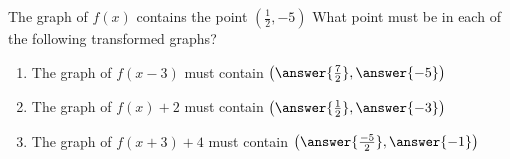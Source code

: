 \documentclass{ximera}
\author{David Kish}
\begin{document}
\begin{exercise}
The graph of $f(x)$ contains the point $\left(\frac{1}{2},-5\right)$ What point must be in each of the following transformed graphs?
\begin{enumerate}
\item The graph of $f(x-3)$ must contain $\left(\answer{\frac{7}{2}},\answer{-5}\right)$
\item The graph of $f(x)+2$ must contain $\left(\answer{\frac{1}{2}},\answer{-3}\right)$
\item The graph of $f(x+3)+4$ must contain $\left(\answer{\frac{-5}{2}},\answer{-1}\right)$
\end{enumerate}
\end{exercise}
\end{document}

